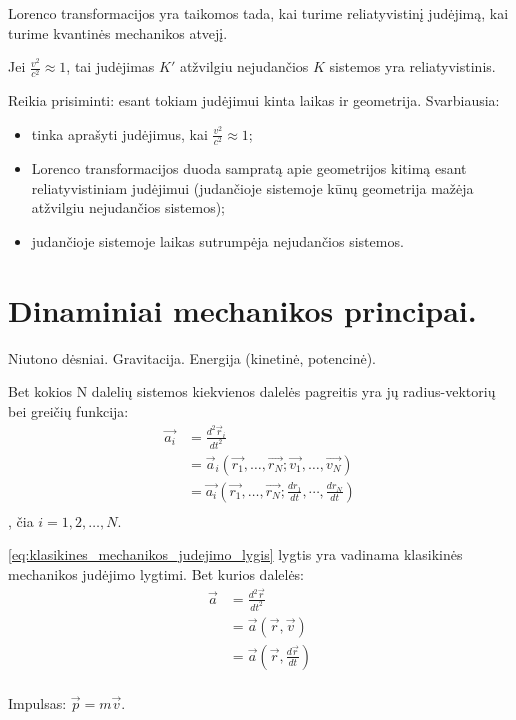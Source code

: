 Lorenco transformacijos yra taikomos tada, kai turime reliatyvistinį
judėjimą, kai turime kvantinės mechanikos atvejį.

Jei $\frac{v^{2}}{c^{2}} \approx 1$, tai judėjimas $K'$ atžvilgiu
nejudančios $K$ sistemos yra reliatyvistinis.

Reikia prisiminti: esant tokiam judėjimui kinta laikas ir geometrija.
Svarbiausia:
\begin{itemize}
  \item tinka aprašyti judėjimus, kai $\frac{v^{2}}{c^{2}} \approx 1$;
  \item Lorenco transformacijos duoda sampratą apie geometrijos
    kitimą esant reliatyvistiniam judėjimui (judančioje sistemoje
    kūnų geometrija mažėja atžvilgiu nejudančios sistemos);
  \item judančioje sistemoje laikas sutrumpėja nejudančios sistemos.
\end{itemize}

\section{Dinaminiai mechanikos principai.}
Niutono dėsniai. Gravitacija. Energija (kinetinė, potencinė).

Bet kokios N dalelių sistemos kiekvienos dalelės pagreitis yra jų
radius-vektorių bei greičių funkcija:
\begin{align}
  \vec{a_{i}}
  &= \frac{d^{2}\vec{r}_{i}}{dt^{2}} \\
  &= \vec{a}_{i}(%
    \vec{r_{1}},\ldots,\vec{r_{N}}; \vec{v_{1}},\ldots,\vec{v_{N}}) \\
  &= \vec{a_{i}} \left(%
    \vec{r_{1}},\ldots,\vec{r_{N}}; %
    \frac{dr_{1}}{dt},\cdots,\frac{dr_{N}}{dt} \right) \\
  \label{eq:klasikines_mechanikos_judejimo_lygis}
\end{align},
čia $i = 1,2,\ldots,N$.

\ref{eq:klasikines_mechanikos_judejimo_lygis} lygtis yra vadinama
klasikinės mechanikos judėjimo lygtimi. Bet kurios dalelės:
\begin{align*}
  \vec{a}
  &= \frac{d^{2}\vec{r}}{dt^{2}} \\
  &= \vec{a}(\vec{r}, \vec{v}) \\
  &= \vec{a} (\vec{r}, \frac{d\vec{r}}{dt}) \\
\end{align*}

Impulsas: $\vec{p} = m\vec{v}$.



